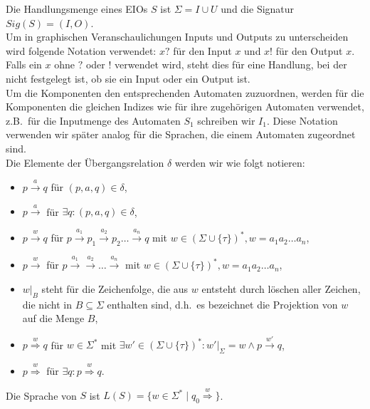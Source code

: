 Die Handlungsmenge eines EIOs $S$ ist $\Sigma = I\cup U$ und die Signatur
$Sig(S)=(I,O)$.\\
Um in graphischen Veranschaulichungen Inputs und Outputs zu unterscheiden wird
folgende Notation verwendet: $x?$ für den Input $x$ und $x!$ für den Output
$x$. Falls ein $x$ ohne $?$ oder $!$ verwendet wird, steht dies für eine
Handlung, bei der nicht festgelegt ist, ob sie ein Input oder ein Output ist.\\
Um die Komponenten den entsprechenden Automaten zuzuordnen, werden für
die Komponenten die gleichen Indizes wie für ihre zugehörigen Automaten
verwendet, z.B.\ für die Inputmenge des Automaten $S_1$ schreiben wir $I_1$.
Diese Notation verwenden wir später analog für die Sprachen, die einem
Automaten zugeordnet sind.\\
Die Elemente der Übergangsrelation $\delta$ werden wir wie folgt notieren:
\begin{itemize}
  \item $p\overset{a}{\rightarrow} q$ für $(p,a,q)\in\delta$,
  \item $p\overset{a}{\rightarrow}$ für $\exists q: (p,a,q)\in\delta$,
  \item $p\overset{w}{\rightarrow} q$ für $p \overset{a_1}{\rightarrow} p_1
    \overset{a_2}{\rightarrow} p_2\dots \overset{a_n}{\rightarrow} q$ mit $w\in
    (\Sigma\cup\{\tau\})^*, w=a_1a_2\dots a_n$,
  \item $p\overset{w}{\rightarrow}$ für $p \overset{a_1}{\rightarrow}
    \overset{a_2}{\rightarrow} \dots \overset{a_n}{\rightarrow}$ mit $w\in
    (\Sigma\cup\{\tau\})^*, w=a_1a_2\dots a_n$,
  \item $w|_B$ steht für die Zeichenfolge, die aus $w$ entsteht durch löschen
    aller Zeichen, die nicht in $B\subseteq\Sigma$ enthalten sind, d.h.\ es
    bezeichnet die Projektion von $w$ auf die Menge $B$,
  \item $p\overset{w}{\Rightarrow} q$ für $w\in\Sigma^*$ mit $\exists
    w'\in(\Sigma\cup\{\tau\})^*:w'|_{\Sigma}=w\wedge p\overset{w'}{\rightarrow}
    q$,
  \item $p\overset{w}{\Rightarrow}$ für $\exists q:p\overset{w}{\Rightarrow}
    q$.
\end{itemize}
Die Sprache von $S$ ist
$L(S)=\{w\in\Sigma^*\mid q_0\overset{w}{\Rightarrow}\}$.

